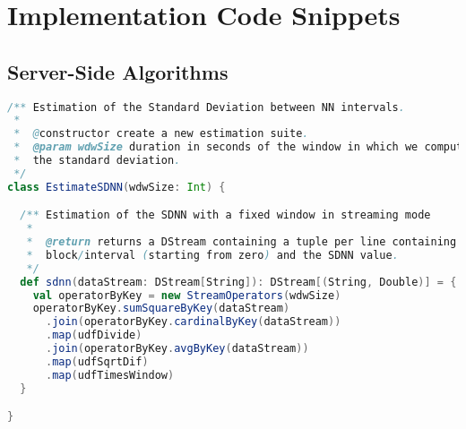 \chapter{Implementation Code Snippets} \label{chap:app-code}

\section{Server-Side Algorithms}

\begin{lstlisting}[language=Scala,caption={Implementation of the \texttt{SDNN} algorithm.},label=code:sdnn]
/** Estimation of the Standard Deviation between NN intervals.
 *                                                                
 *  @constructor create a new estimation suite.
 *  @param wdwSize duration in seconds of the window in which we compute
 *  the standard deviation.
 */                                                                   
class EstimateSDNN(wdwSize: Int) { 

  /** Estimation of the SDNN with a fixed window in streaming mode
   *
   *  @return returns a DStream containing a tuple per line containing the time
   *  block/interval (starting from zero) and the SDNN value.
   */
  def sdnn(dataStream: DStream[String]): DStream[(String, Double)] = {
    val operatorByKey = new StreamOperators(wdwSize)
    operatorByKey.sumSquareByKey(dataStream)
      .join(operatorByKey.cardinalByKey(dataStream))
      .map(udfDivide)
      .join(operatorByKey.avgByKey(dataStream))
      .map(udfSqrtDif)
      .map(udfTimesWindow)
  }

}
\end{lstlisting}

